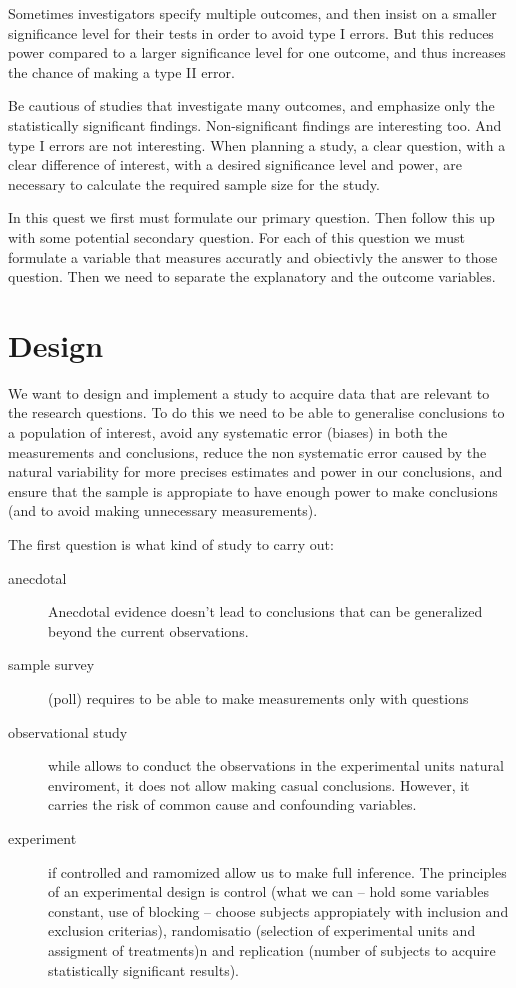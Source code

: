 Sometimes investigators specify multiple outcomes, and then insist on a smaller
significance level for their tests in order to avoid type I errors. But this
reduces power compared to a larger significance level for one outcome, and thus
increases the chance of making a type II error. 

Be cautious of studies that investigate many outcomes, and emphasize only the
statistically significant findings. Non-significant findings are interesting
too. And type I errors are not interesting. When planning a study, a clear
question, with a clear difference of interest, with a desired significance level
and power, are necessary to calculate the required sample size for the study.

In this quest we first must formulate our primary question. Then follow this up
with some potential secondary question. For each of this question we must
formulate a variable that measures accuratly and obiectivly the answer to those
question. Then we need to separate the explanatory and the outcome variables.

\section{Design}

We want to design and implement a study to acquire data that are relevant to the
research questions. To do this we need to be able to generalise conclusions to a
population of interest, avoid any systematic error (biases) in both the
measurements and conclusions, reduce the non systematic error caused by the
natural variability for more precises estimates and power in our conclusions,
and ensure that the sample is appropiate to have enough power to make
conclusions (and to avoid making unnecessary measurements).

The first question is what kind of study to carry out:

\begin{description}
  \item[anecdotal] Anecdotal evidence doesn't lead to conclusions that can be
  generalized beyond the current observations.
  \item[sample survey] (poll) requires to be able to make measurements only with
  questions 
  \item[observational study] while allows to conduct the observations in the
  experimental units natural enviroment, it does not allow making casual
  conclusions. However, it carries the risk of common cause and confounding
  variables.
  \item[experiment] if controlled and ramomized allow us to make full inference.
  The principles of an experimental design is control (what we can -- hold
  some variables constant, use of blocking -- choose subjects appropiately
  with inclusion and exclusion criterias), randomisatio (selection of
  experimental units and assigment of treatments)n and replication (number of
  subjects to acquire statistically significant results).
\end{description}

